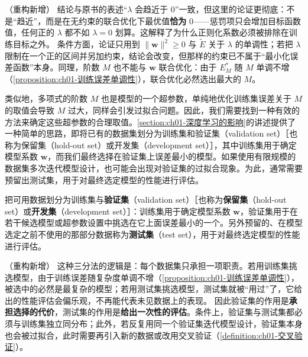 \documentclass[../../main.tex]{subfiles}
\begin{document}
\begin{remark}（重构新增）
结论与原书的表述“$\lambda$ 会趋近于 $0$”一致，但这里的论证更彻底：不是“趋近”，而是在无约束的联合优化下最优值\textbf{恰为} $0$——惩罚项只会增加目标函数值，任何正的 $\lambda$ 都不如 $\lambda=0$ 划算。这解释了为什么正则化系数必须被排除在训练目标之外。
条件方面，论证只用到 $\|\mathbf{w}\|^{2}\geqslant 0$ 与 $\tilde{E}$ 关于 $\lambda$ 的单调性；若把 $\lambda$ 限制在一个正的区间并另加约束，结论会改变，但那样的约束已不属于“最小化误差函数”本身。同理，阶数 $M$ 也不能与 $\mathbf{w}$ 联合优化：由于 $E_{M}^{*}$ 随 $M$ 单调不增（\cref{proposition:ch01-训练误差单调性}），联合优化必然选出最大的 $M$。
\end{remark}

类似地，多项式的阶数 $M$ 也是模型的一个超参数，单纯地优化训练集误差关于 $M$ 的取值会导致 $M$ 过大，同样会引发过拟合问题。因此，我们需要找到一种有效的方法来确定这些超参数的合理取值。\cref{section:ch01-深度学习的影响}的讲述提供了一种简单的思路，即将已有的数据集划分为训练集和验证集（validation set）［也称为保留集（hold-out set）或开发集（development set）］，其中训练集用于确定模型系数 $\mathbf{w}$，而我们最终选择在验证集上误差最小的模型。如果使用有限规模的数据集多次迭代模型设计，也可能会出现对验证集的过拟合现象。为此，通常需要预留出测试集，用于对最终选定模型的性能进行评估。

\begin{definition}[验证集与测试集]\label{definition:ch01-验证集与测试集}
把可用数据划分为训练集与\textbf{验证集}（validation set）［也称为\textbf{保留集}（hold-out set）或\textbf{开发集}（development set）］：训练集用于确定模型系数 $\mathbf{w}$，验证集用于在若干候选模型或超参数设置中挑选在它上面误差最小的一个。另外预留的、在模型选定之前不使用的那部分数据称为\textbf{测试集}（test set），用于对最终选定模型的性能进行评估。
\end{definition}

\begin{remark}（重构新增）
这种三分法的逻辑是：每个数据集只承担一项职责。若用训练集挑选模型，由于训练误差随复杂度单调不增（\cref{proposition:ch01-训练误差单调性}），被选中的必然是最复杂的模型；若用测试集挑选模型，测试集就被“用过”了，它给出的性能评估会偏乐观，不再能代表未见数据上的表现。
因此验证集的作用是\textbf{承担选择的代价}，测试集的作用是\textbf{给出一次性的评估}。条件上，验证集与测试集都必须与训练集独立同分布；此外，若反复用同一个验证集迭代模型设计，验证集本身也会被过拟合，此时需要再引入新的数据或改用交叉验证（\cref{definition:ch01-交叉验证}）。
\end{remark}
\end{document}

